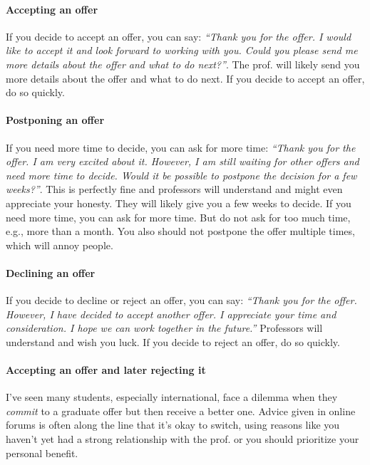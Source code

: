 \documentclass[oneside,11pt,dvipsnames]{book}
\begin{document}
\paragraph{Accepting an offer} If you decide to accept an offer, you can say: \emph{``Thank you for the offer.  I would like to accept it and look forward to working with you.  Could you please send me more details about the offer and what to do next?''}. The prof. will likely send you more details about the offer and what to do next.  If you decide to accept an offer, do so quickly.



\paragraph{Postponing an offer} If you need more time to decide, you can ask for more time: \emph{``Thank you for the offer.  I am very excited about it.  However, I am still waiting for other offers and need more time to decide.  Would it be possible to postpone the decision for a few weeks?''}.  This is perfectly fine and professors will understand and might even appreciate your honesty.  They will likely give you a few weeks to decide.  If you need more time, you can ask for more time.  But do not ask for too much time, e.g., more than a month.  You also should not postpone the offer multiple times, which will annoy people.



\paragraph{Declining an offer} If you decide to decline or reject an offer, you can say: \emph{``Thank you for the offer. However, I have decided to accept another offer.  I appreciate your time and consideration.  I hope we can work together in the future.''}  Professors will understand and wish you luck.  If you decide to reject an offer, do so quickly.


\paragraph{Accepting an offer and later rejecting it}

I've seen many students, especially international, face a dilemma when they \emph{commit} to a graduate offer but then receive a better one. Advice given in online forums is often along the line that it's okay to switch, using reasons like you haven't yet had a strong relationship with the prof. or you should prioritize your personal benefit.
\end{document}
